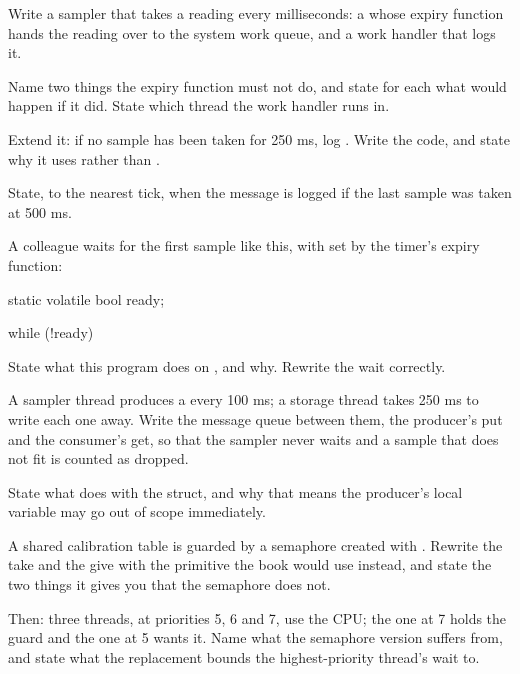 \label{exb:q:5}

 Write a sampler that takes a reading every 
milliseconds: a  whose expiry function hands the reading over to the system work
queue, and a work handler that logs it.

Name two things the expiry function must not do, and state for each what would happen if it did.
State which thread the work handler runs in. 

 Extend it: if no sample has been taken for 250 ms, log . Write the code, and
state why it uses  rather than .

State, to the nearest tick, when the message is logged if the last sample was taken at 500 ms.

 A colleague waits for the first sample like this, with  set by the timer's
expiry function:

\begin{ccode}
static volatile bool ready;

while (!ready) {
}
\end{ccode}

\noindent State what this program does on , and why. Rewrite the wait correctly.

\label{exb:q:6}

 A sampler thread produces a  every 100 ms; a storage thread takes
250 ms to write each one away. Write the message queue between them, the producer's put and the
consumer's get, so that the sampler never waits and a sample that does not fit is counted as
dropped.

State what  does with the struct, and why that means the producer's local
variable may go out of scope immediately. 

 A shared calibration table is guarded by a semaphore created with
. Rewrite the take and the give with the primitive the book would use
instead, and state the two things it gives you that the semaphore does not.

Then: three threads, at priorities 5, 6 and 7, use the CPU; the one at 7 holds the guard and the one
at 5 wants it. Name what the semaphore version suffers from, and state what the replacement bounds
the highest-priority thread's wait to. 

